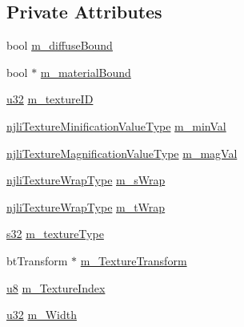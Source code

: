 \subsection*{Private Attributes}
\begin{DoxyCompactItemize}
\item 
bool \mbox{\hyperlink{classnjli_1_1_material_property_aeb9f7375f6cf29868549e99f1d709b3d}{m\+\_\+diffuse\+Bound}}
\item 
bool $\ast$ \mbox{\hyperlink{classnjli_1_1_material_property_a792f0aecc3bf0a36018e7abeca5c7080}{m\+\_\+material\+Bound}}
\item 
\mbox{\hyperlink{_util_8h_a10e94b422ef0c20dcdec20d31a1f5049}{u32}} \mbox{\hyperlink{classnjli_1_1_material_property_a54b3b51f4b0d736d316b63777ccda316}{m\+\_\+texture\+ID}}
\item 
\mbox{\hyperlink{namespacenjli_a980b62f11da3b7143a525012cb512bac}{njli\+Texture\+Minification\+Value\+Type}} \mbox{\hyperlink{classnjli_1_1_material_property_a13b42d54787929d981050557ac4748a8}{m\+\_\+min\+Val}}
\item 
\mbox{\hyperlink{namespacenjli_a9fe7a080d946c5be3afc71d834dc7902}{njli\+Texture\+Magnification\+Value\+Type}} \mbox{\hyperlink{classnjli_1_1_material_property_a99668eb548352e3b136eff0d78bdaf47}{m\+\_\+mag\+Val}}
\item 
\mbox{\hyperlink{namespacenjli_a6e9496d4850ec7151f04a220e1979b62}{njli\+Texture\+Wrap\+Type}} \mbox{\hyperlink{classnjli_1_1_material_property_a18842aef4fce7ec9871bcf206fc5d517}{m\+\_\+s\+Wrap}}
\item 
\mbox{\hyperlink{namespacenjli_a6e9496d4850ec7151f04a220e1979b62}{njli\+Texture\+Wrap\+Type}} \mbox{\hyperlink{classnjli_1_1_material_property_a1db9e13afa4a288eaf901c7e6726d36f}{m\+\_\+t\+Wrap}}
\item 
\mbox{\hyperlink{_util_8h_aa62c75d314a0d1f37f79c4b73b2292e2}{s32}} \mbox{\hyperlink{classnjli_1_1_material_property_a6561cf1412426aa7a0b40590ad221169}{m\+\_\+texture\+Type}}
\item 
bt\+Transform $\ast$ \mbox{\hyperlink{classnjli_1_1_material_property_aeab9a246acdf7a58f77381addbe25af3}{m\+\_\+\+Texture\+Transform}}
\item 
\mbox{\hyperlink{_util_8h_aed742c436da53c1080638ce6ef7d13de}{u8}} \mbox{\hyperlink{classnjli_1_1_material_property_acbc4746b18b182d07313eeab1fb0a62c}{m\+\_\+\+Texture\+Index}}
\item 
\mbox{\hyperlink{_util_8h_a10e94b422ef0c20dcdec20d31a1f5049}{u32}} \mbox{\hyperlink{classnjli_1_1_material_property_a8e0a5e6f9f07c09905cc9bdef219486b}{m\+\_\+\+Width}}

\end{DoxyCompactItemize}
